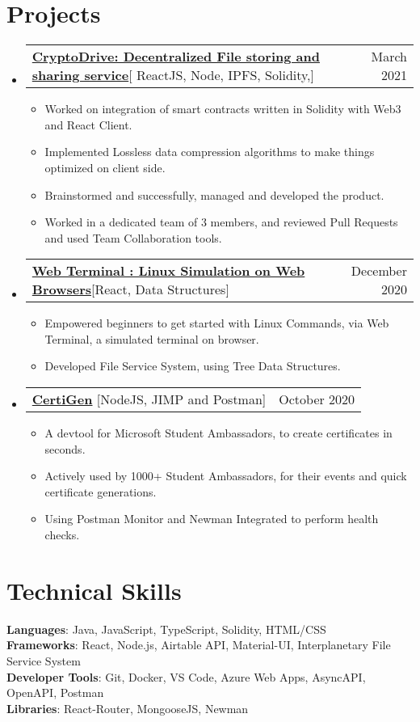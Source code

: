 \documentclass[letterpaper,11pt]{article}
\makeatletter
\newcommand{\resumeItem}[1]{
  \item\small{
    {#1 \vspace{-2pt}}
  }
}
\newcommand{\resumeProjectHeading}[2]{
    \item
    \begin{tabular*}{0.97\textwidth}{l@{\extracolsep{\fill}}r}
      \small#1 & #2 \\
    \end{tabular*}\vspace{-7pt}
}
\newcommand{\resumeSubHeadingListStart}{\begin{itemize}[leftmargin=0.15in, label={}]}
\newcommand{\resumeSubHeadingListEnd}{\end{itemize}}
\newcommand{\resumeItemListStart}{\begin{itemize}}
\newcommand{\resumeItemListEnd}{\end{itemize}\vspace{-5pt}}
\makeatother
\begin{document}
\section{Projects}
    \resumeSubHeadingListStart
      \resumeProjectHeading
          {\textbf{\href{https://www.cryptodrive.tech/}{CryptoDrive: Decentralized File storing and sharing service}}{[ ReactJS, Node, IPFS, Solidity,]}}{March 2021}
          \resumeItemListStart
            \resumeItem{ Worked on integration of smart contracts written in Solidity with Web3 and React Client.}
            \resumeItem{ Implemented Lossless data compression algorithms to make things optimized on client side.}
            \resumeItem{ Brainstormed and successfully, managed and developed the product.}
            \resumeItem{ Worked in a dedicated team of 3 members, and reviewed Pull Requests and used Team Collaboration tools. }
          \resumeItemListEnd
    \resumeSubHeadingListEnd
    
     \resumeSubHeadingListStart
      \resumeProjectHeading
          {\textbf{\href{https://imabp.github.io/WebTerminal/}{Web Terminal : Linux Simulation on Web Browsers}}{[React, Data Structures]}}{December 2020}
          \resumeItemListStart
            \resumeItem{Empowered beginners to get started with Linux Commands, via Web Terminal, a simulated terminal on browser. }
            \resumeItem{Developed File Service System, using Tree Data Structures. }
          \resumeItemListEnd
    \resumeSubHeadingListEnd
  \resumeSubHeadingListStart
      \resumeProjectHeading
          {\textbf{\href{https://github.com/imabp/CertiGen}{\textbf{CertiGen}}}{ [NodeJS, JIMP and Postman]}}{October 2020}
          \resumeItemListStart
            \resumeItem{A devtool for Microsoft Student Ambassadors, to create certificates in seconds. }
            \resumeItem{Actively used by 1000+ Student Ambassadors, for their events and quick certificate generations. }
            \resumeItem{Using Postman Monitor and Newman Integrated to perform health checks.}
          \resumeItemListEnd
    \resumeSubHeadingListEnd


%
\section{Technical Skills}
 \begin{itemize}[leftmargin=0.15in, label={}]
    \small{\item{
     \textbf{Languages}{: Java, JavaScript, TypeScript, Solidity, HTML/CSS} \\
     \textbf{Frameworks}{: React, Node.js, Airtable API, Material-UI, Interplanetary File Service System  } \\
     \textbf{Developer Tools}{: Git, Docker, VS Code, Azure Web Apps, AsyncAPI, OpenAPI, Postman} \\
     \textbf{Libraries}{: React-Router, MongooseJS, Newman }
    }}
 \end{itemize}
\end{document}
